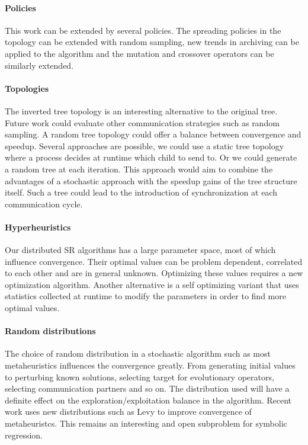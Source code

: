 \paragraph{Policies}
This work can be extended by several policies. The spreading policies in the topology can be extended with random sampling, new trends in archiving can be applied to the algorithm and the mutation and crossover operators can be similarly extended. 

\paragraph{Topologies}
The inverted tree topology is an interesting alternative to the original tree. Future work could evaluate other communication strategies such as random sampling. A random tree topology could offer a balance between convergence and speedup. Several approaches are possible, we could use a static tree topology where a process decides at runtime which child to send to. Or we could generate a random tree at each iteration. This approach would aim to combine the advantages of a stochastic approach with the speedup gains of the tree structure itself. Such a tree could lead to the introduction of synchronization at each communication cycle.

\paragraph{Hyperheuristics}
Our distributed SR algorithms has a large parameter space, most of which influence convergence. Their optimal values can be problem dependent, correlated to each other and are in general unknown. Optimizing these values requires a new optimization algorithm. Another alternative is a self optimizing variant that uses statistics collected at runtime to modify the parameters in order to find more optimal values.

\paragraph{Random distributions}
The choice of random distribution in a stochastic algorithm such as most metaheuristics influences the convergence greatly. From generating initial values to perturbing known solutions, selecting target for evolutionary operators, selecting communication partners and so on. The distribution used will have a definite effect on the exploration/exploitation balance in the algorithm. Recent work uses new distributions such as Levy \citep{ABCLevy} to improve convergence of metaheuristcs. This remains an interesting and open subproblem for symbolic regression. 
